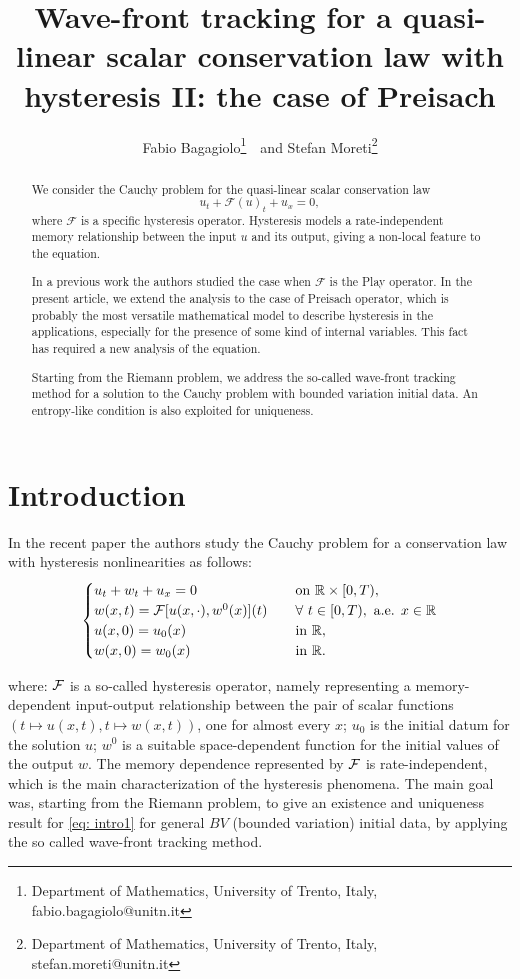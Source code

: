 \documentclass[12pt]{article}
\title{Wave-front tracking for a quasi-linear scalar conservation law with hysteresis II: the case of Preisach}
\author{Fabio Bagagiolo\footnote{Department of Mathematics, University of Trento, Italy, fabio.bagagiolo@unitn.it}\ \ and Stefan Moreti\footnote{Department of Mathematics, University of Trento, Italy, stefan.moreti@unitn.it}}
\date{}
\newcommand{\R}{\mathbb{R}}
\newcommand{\F}{\mathcal{F}}
\newcommand{\1}{\mathds{1}}
\theoremstyle{definition}
\begin{document}
\maketitle

\begin{abstract}
We consider the Cauchy problem for the quasi-linear scalar conservation law \[u_t+\F(u)_t+u_x=0,\] where $\F$ is a specific hysteresis operator. 
Hysteresis models a rate-independent memory relationship between the input $u$ and its output, giving a non-local feature to the equation.

In a previous work the authors studied the case when $\mathcal{F}$ is the Play operator. In the present article, we extend the analysis to the case of Preisach operator, which is probably the most versatile mathematical model to describe hysteresis in the applications, especially for the presence of some kind of internal variables. This fact has required a new analysis of the equation. 

Starting from the Riemann problem, we address the so-called wave-front tracking method for a solution to the Cauchy problem with bounded variation initial data. An entropy-like condition is also exploited for uniqueness. 
\end{abstract}


\section*{Introduction}\label{S0}
In the recent paper \cite{BFMS} the authors study the Cauchy problem for a conservation law with hysteresis nonlinearities as follows:
\begin{equation}\label{eq: intro1}
    \begin{cases}
        u_t+w_t+u_x=0 &\quad \text{on } \R \times [0,T),\\
        w(x,t)={\cal F}[u(x,\cdot),w^0(x)](t)&\quad \forall\ t\in[0,T),\ \text{a.e. } x\in\R\\
        u(x,0)=u_0(x) & \quad \text{in } \R, \\ w(x,0)=w_0(x) & \quad \text{in } \R.
    \end{cases}
\end{equation}

\noindent
where: $\cal F$ is a so-called hysteresis operator, namely representing a memory-dependent input-output relationship between the pair of scalar functions $(t\mapsto u(x,t),t\mapsto w(x,t))$, one for almost every $x$; $u_0$ is the initial datum for the solution $u$; $w^0$ is a suitable space-dependent function for the initial values of the output $w$. The memory dependence represented by $\cal F$ is rate-independent, which is the main characterization of the hysteresis phenomena. The main goal was, starting from the Riemann problem, to give an existence and uniqueness result for \eqref{eq: intro1} for general $BV$ (bounded variation) initial data, by applying the so called wave-front tracking method.
\end{document}
